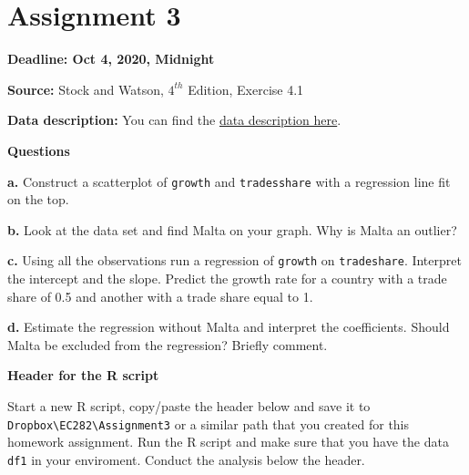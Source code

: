 \documentclass[
]{book}
\begin{document}
\hypertarget{assignment-3}{%
\section{Assignment 3}\label{assignment-3}}

\textbf{Deadline: Oct 4, 2020, Midnight}

\textbf{Source:} Stock and Watson, \(4^{th}\) Edition, Exercise 4.1

\textbf{Data description:} You can find the \href{https://www.dropbox.com/s/3e24u6eymvmhldd/Growth_Description.pdf?dl=1}{data description here}.

\textbf{Questions}

\textbf{a.} Construct a scatterplot of \texttt{growth} and \texttt{tradesshare} with a regression line fit on the top.

\textbf{b.} Look at the data set and find Malta on your graph. Why is Malta an outlier?

\textbf{c.} Using all the observations run a regression of \texttt{growth} on \texttt{tradeshare}. Interpret the intercept and the slope. Predict the growth rate for a country with a trade share of 0.5 and another with a trade share equal to 1.

\textbf{d.} Estimate the regression without Malta and interpret the coefficients. Should Malta be excluded from the regression? Briefly comment.

\textbf{Header for the R script}

Start a new R script, copy/paste the header below and save it to \texttt{Dropbox\textbackslash{}EC282\textbackslash{}Assignment3} or a similar path that you created for this homework assignment. Run the R script and make sure that you have the data \texttt{df1} in your enviroment. Conduct the analysis below the header.
\end{document}
